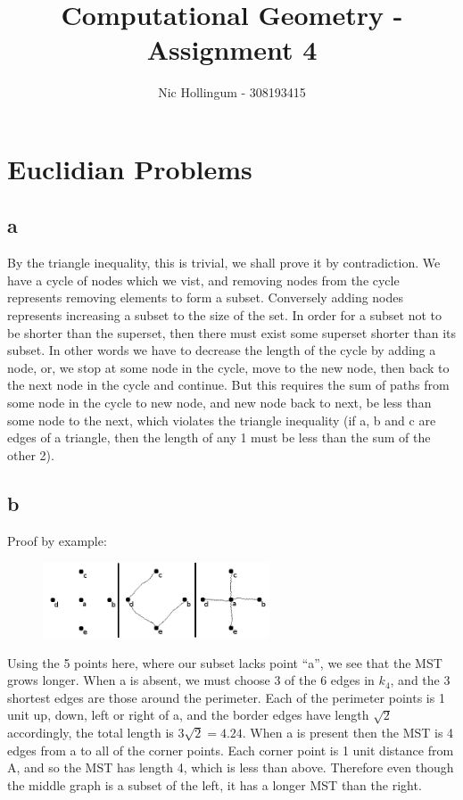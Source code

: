 \documentclass{article}
\author{Nic Hollingum - 308193415}
\title{Computational Geometry - Assignment 4}
\begin{document}
\maketitle

\section {Euclidian Problems}

\subsection*{a}
By the triangle inequality, this is trivial, we shall prove it by contradiction.
We have a cycle of nodes which we vist, and removing nodes from the cycle represents removing elements to form a subset.
Conversely adding nodes represents increasing a subset to the size of the set.
In order for a subset not to be shorter than the superset, then there must exist some superset shorter than its subset.
In other words we have to decrease the length of the cycle by adding a node, or, we stop at some node in the cycle, move to the new node, then back to the next node in the cycle and continue.
But this requires the sum of paths from some node in the cycle to new node, and new node back to next, be less than some node to the next, which violates the triangle inequality (if a, b and c are edges of a triangle, then the length of any 1 must be less than the sum of the other 2).

\subsection*{b}
Proof by example:

\begin{figure}[htb]
\begin{center}
\leavevmode
\includegraphics[width=0.6\textwidth]{mst.png}
\end{center}
\label{fig:mst}
\end{figure}

Using the 5 points here, where our subset lacks point ``a'', we see that the MST grows longer.
When a is absent, we must choose 3 of the 6 edges in $k_4$, and the 3 shortest edges are those around the perimeter.
Each of the perimeter points is 1 unit up, down, left or right of a, and the border edges have length $\sqrt 2$ accordingly, the total length is $3 \sqrt 2 = 4.24$.
When a is present then the MST is 4 edges from a to all of the corner points.
Each corner point is 1 unit distance from A, and so the MST has length 4, which is less than above.
Therefore even though the middle graph is a subset of the left, it has a longer MST than the right.
\end{document}
